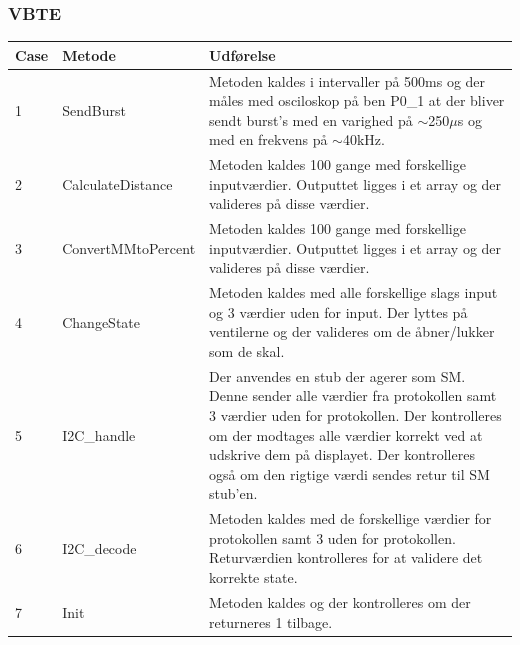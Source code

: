 \subsubsection{VBTE}
\begin{table}[H]
\centering
\begin{tabular}{| p{1cm}  | p{4.5cm} | p{8cm} |}
\hline
Case &Metode &Udførelse\\\hline
1 &SendBurst &Metoden kaldes i intervaller på 500ms og der måles med osciloskop på ben P0\_1 at der bliver sendt burst's med en varighed på $\sim$250$\mu$s og med en frekvens på $\sim$40kHz.\\\hline
2  &CalculateDistance & Metoden kaldes 100 gange med forskellige inputværdier. Outputtet ligges i et array og der valideres på disse værdier.\\\hline
3 &ConvertMMtoPercent & Metoden kaldes 100 gange med forskellige inputværdier. Outputtet ligges i et array og der valideres på disse værdier.\\\hline
4 & ChangeState & Metoden kaldes med alle forskellige slags input og 3 værdier uden for input. Der lyttes på ventilerne og der valideres om de åbner/lukker som de skal.\\\hline
5 & I2C\_handle & Der anvendes en stub der agerer som SM. Denne sender alle værdier fra protokollen samt 3 værdier uden for protokollen. Der kontrolleres om der modtages alle værdier korrekt ved at udskrive dem på displayet. Der kontrolleres også om den rigtige værdi sendes retur til SM stub'en.\\\hline
6 & I2C\_decode & Metoden kaldes med de forskellige værdier for protokollen samt 3 uden for protokollen. Returværdien kontrolleres for at validere det korrekte state.\\\hline
7 & Init & Metoden kaldes og der kontrolleres om der returneres 1 tilbage.\\\hline
\end{tabular}
\end{table}
